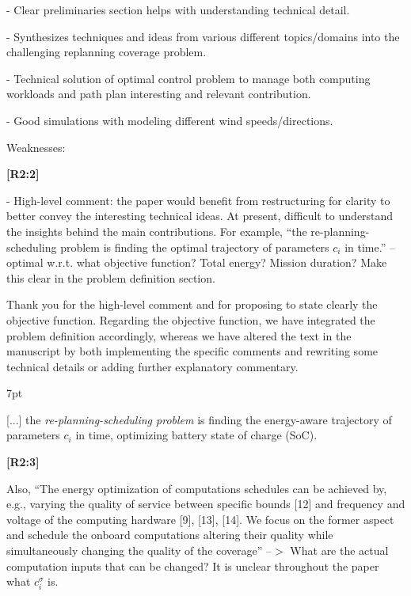 \documentclass[10pt]{letter}
\newenvironment{formal}{%
  \def\FrameCommand{%
    \hspace{1pt}%
    {\color{red}\vrule width 2pt}%
    {\color{formalshade}\vrule width 4pt}%
    \colorbox{formalshade}%
  }%
  \MakeFramed{\advance\hsize-\width\FrameRestore}%
  \noindent\hspace{-4.55pt}%
  \begin{adjustwidth}{}{7pt}%
  \vspace{2pt}\vspace{2pt}%
}
{%
  \vspace{2pt}\end{adjustwidth}\endMakeFramed%
}
\begin{document}
- Clear preliminaries section helps with understanding technical detail.

- Synthesizes techniques and ideas from various different topics/domains into the challenging replanning coverage problem.

- Technical solution of optimal control problem to manage both computing workloads and path plan interesting and relevant contribution.
  
- Good simulations with modeling different wind speeds/directions.

\vspace{2em}

Weaknesses:

  
{\hspace*{-4.5em}\textbf{[R2:2]}\vspace*{-1.9em}}
  
- High-level comment: the paper would benefit from restructuring for clarity to better convey the interesting technical ideas. At present, difficult to understand the insights behind the main contributions. For example, ``the re-planning-scheduling problem is finding the optimal trajectory of parameters $c_i$ in time.'' -- optimal w.r.t. what objective function? Total energy? Mission duration? Make this clear in the problem definition section. 
  
{\color{blue} 

{\hspace*{-4.5em}{[R2:2]}\vspace*{-1.9em}}

Thank you for the high-level comment and for proposing to state clearly the objective function. Regarding the objective function, we have integrated the problem definition accordingly, whereas we have altered the text in the manuscript by both implementing the specific comments and rewriting some technical details or adding further explanatory commentary. 

\begin{formal}
  {\color{black} [...] the \emph{re-planning-scheduling problem} is finding the {\color{blue}energy-aware} trajectory of parameters $c_i$ in time{\color{blue}, optimizing battery state of charge (SoC)}.}
  \vspace*{1ex}
\end{formal}
}
  
  {\hspace*{-4.5em}\textbf{[R2:3]}\vspace*{-1.9em}}

  Also, ``The energy optimization of computations schedules can be achieved by, e.g., varying the quality of service between specific bounds [12] and frequency and voltage of the computing hardware [9], [13], [14]. We focus on the former aspect and schedule the onboard computations altering their quality while simultaneously changing the quality of the coverage'' --$>$ What are the actual computation inputs that can be changed? It is unclear throughout the paper what $c_i^\sigma$ is. 
  
\end{document}
